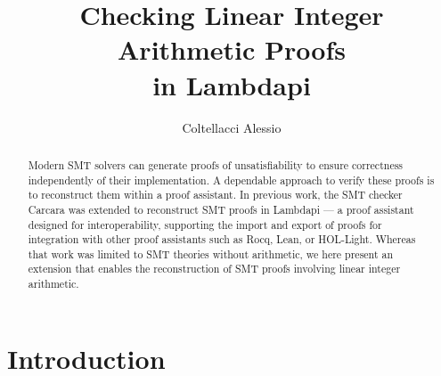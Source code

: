 \documentclass[runningheads]{llncs}
\begin{document}
\title{Checking Linear Integer Arithmetic Proofs\\ in Lambdapi}


\author{Coltellacci Alessio
}
%
%

%
\maketitle
%
\begin{abstract}
Modern SMT solvers can generate proofs of unsatisfiability to ensure correctness independently of their implementation.
A dependable approach to verify these proofs is to reconstruct them within a proof assistant.
In previous work, the SMT checker Carcara was extended to reconstruct SMT proofs in Lambdapi — a proof assistant designed for interoperability,
supporting the import and export of proofs for integration with other proof assistants such as Rocq, Lean, or HOL-Light.
Whereas that work was limited to SMT theories without arithmetic, we here present an extension that enables the reconstruction of SMT proofs involving linear integer arithmetic.

\end{abstract}

\section{Introduction}
\end{document}
